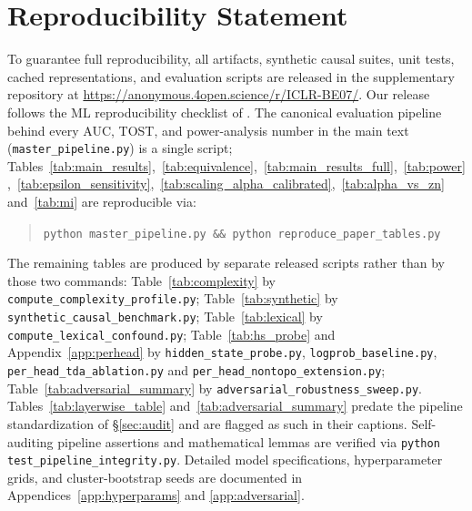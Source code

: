 \documentclass{article}
\begin{document}
\section*{Reproducibility Statement}
To guarantee full reproducibility, all artifacts, synthetic causal suites, unit tests, cached representations, and evaluation scripts are released in the supplementary repository at \url{https://anonymous.4open.science/r/ICLR-BE07/}. Our release follows the ML reproducibility checklist of \citet{pineau2021}. The canonical evaluation pipeline behind every AUC, TOST, and power-analysis number in the main text (\texttt{master\_pipeline.py}) is a single script; Tables~\ref{tab:main_results},~\ref{tab:equivalence},~\ref{tab:main_results_full},~\ref{tab:power},~\ref{tab:epsilon_sensitivity},~\ref{tab:scaling_alpha_calibrated},~\ref{tab:alpha_vs_zn} and~\ref{tab:mi} are reproducible via:
\begin{quote}
\texttt{python master\_pipeline.py \&\& python reproduce\_paper\_tables.py}
\end{quote}
The remaining tables are produced by separate released scripts rather than by those two commands: Table~\ref{tab:complexity} by \texttt{compute\_complexity\_profile.py}; Table~\ref{tab:synthetic} by \texttt{synthetic\_causal\_benchmark.py}; Table~\ref{tab:lexical} by \texttt{compute\_lexical\_confound.py}; Table~\ref{tab:hs_probe} and Appendix~\ref{app:perhead} by \texttt{hidden\_state\_probe.py}, \texttt{logprob\_baseline.py}, \texttt{per\_head\_tda\_ablation.py} and \texttt{per\_head\_nontopo\_extension.py}; Table~\ref{tab:adversarial_summary} by \texttt{adversarial\_robustness\_sweep.py}. Tables~\ref{tab:layerwise_table} and~\ref{tab:adversarial_summary} predate the pipeline standardization of \S\ref{sec:audit} and are flagged as such in their captions. Self-auditing pipeline assertions and mathematical lemmas are verified via \texttt{python test\_pipeline\_integrity.py}. Detailed model specifications, hyperparameter grids, and cluster-bootstrap seeds are documented in Appendices~\ref{app:hyperparams} and \ref{app:adversarial}.
\end{document}
